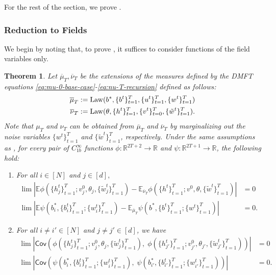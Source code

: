 \documentclass{article}
\newcommand{\1}{\mathbbm{1}}
\theoremstyle{plain}
\newtheorem{theorem}{Theorem}[section]
\theoremstyle{definition}
\theoremstyle{remark}
\newcommand{\E}{\mathbb{E}}
\newcommand{\Law}{\mathrm{Law}}
\newcommand{\Cov}{\mathsf{Cov}}
\newcommand{\R}{\mathbb{R}}
\begin{document}
For the rest of the section, we prove .
\subsubsection{Reduction to Fields}
We begin by noting that, to prove , it suffices to consider functions of the field variables only.
\begin{theorem}\label{thm:reduction-to-fields}
    Let $\overline{\mu}_T, \overline{\nu}_T$ be the extensions of the measures defined by the DMFT equations \eqref{eq:mu-0-base-case}-\eqref{eq:nu-T-recursion} defined as follows:
    \begin{align*}
        \overline{\mu}_T &:= \Law(b^*, \{b^t\}_{t=1}^T, \{u^t\}_{t=1}^T, \{w^t\}_{t=1}^T) \\
        \overline{\nu}_T &:= \Law(\theta, \{h^t\}_{t=1}^T, \{v^t\}_{t=0}^T, \{\Tilde{w}^t\}_{t=1}^T).
    \end{align*}
    Note that $\mu_T$ and $\nu_T$ can be obtained from $\overline{\mu}_T$ and $\overline{\nu}_T$  by marginalizing out the noise variables $\{w^t\}_{t=1}^T$ and $\{\tilde{w}^t\}_{t=1}^T$, respectively. Under the same assumptions as , for every pair of $C^\infty_{1b}$ functions $\phi:\R^{2T+2}\to\R$ and $\psi:\R^{2T+1}\to \R$, the following hold:
    \begin{enumerate}
        \item For all $i\in [N]$ and $j\in [d],$
        \begin{align}
            \lim |\E \phi( \{h_j^t\}_{t=1}^T;v^0_j,\theta_j,\{\tilde{w}_j^t\}_{t=1}^T) - \E_{\overline{\nu}_T} \phi( \{h^t\}_{t=1}^T;v^0,\theta,\{\tilde{w}^t\}_{t=1}^T)| &= 0 \label{eq:nu-marginal-covergence} \\
            \lim |\E \psi(b_i^*, \{b_i^t\}_{t=1}^T; \{w^t_i\}_{t=1}^T) - \E_{\overline{\mu}_T} \psi(b^*, \{b^t\}_{t=1}^T;\{w^t\}_{t=1}^T)| &= 0.\label{eq:mu-marginal-covergence} 
        \end{align}
        \item For all $i\neq i' \in [N]$ and $j\neq j'\in [d]$, we have
        \begin{align}
            \lim  \left|\Cov\left(\phi( \{h_j^t\}_{t=1}^T;v^0_j,\theta_j,\{\tilde{w}_j^t\}_{t=1}^T),\; \phi( \{h_{j'}^t\}_{t=1}^T;v^0_{j'},\theta_{j'},\{\tilde{w}_{j'}^t\}_{t=1}^T)\right)\right| &= 0 \label{eq:nu-decoupling}\\
            \lim  \left|\Cov\left( \psi(b_i^*, \{b_i^t\}_{t=1}^T; \{w^t_i\}_{t=1}^T),\; \psi(b_{i'}^*, \{b_{i'}^t\}_{t=1}^T; \{w^t_{i'}\}_{t=1}^T)\right)\right| &= 0.\label{eq:mu-decoupling}
        \end{align}
        \end{enumerate}
\end{theorem}
\end{document}
